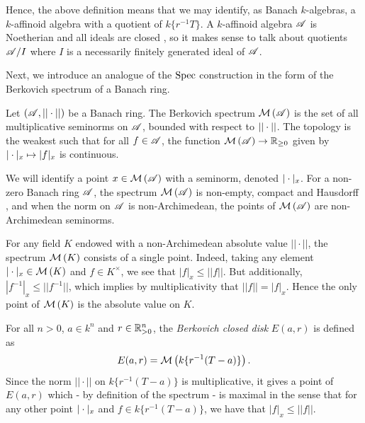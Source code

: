 Hence, the above definition means that we may identify, as Banach $k$-algebras, a $k$-affinoid algebra with a quotient of $k\{r^{-1}T\}$. 
A $k$-affinoid algebra $\mathscr{A}$ is Noetherian and all ideals are closed \parencite[Prop. 2.1.3]{berk1}, so it makes sense to talk about quotients $\mathscr{A}/I$ where $I$ is a necessarily finitely generated ideal of $\mathscr{A}$.

Next, we introduce an analogue of the $\operatorname{Spec}$ construction in the form of the Berkovich spectrum of a Banach ring.

\begin{defn}\parencite[\S 1.2]{berk1}
    Let $(\mathscr{A}, ||\cdot||)$ be a Banach ring. The Berkovich spectrum $\mathcal{M}\left(\mathscr{A}\right)$ is the set of
    all multiplicative seminorms on $\mathscr{A}$, bounded with respect to $||\cdot||$. The topology is the
    weakest such that for all $f \in \mathscr{A}$, the function $\mathcal{M}\left(\mathscr{A}\right) \to \mathbb{R}_{\geq 0}$ given by $|\cdot|_x \mapsto |f|_x$ is continuous.
\end{defn}

We will identify a point $x \in \mathcal{M}\left(\mathscr{A}\right)$ with a seminorm, denoted $|\cdot|_x$. 
For a non-zero Banach ring $\mathscr{A}$, the spectrum $\mathcal{M}\left(\mathscr{A}\right)$ is non-empty, compact and Hausdorff \parencite[Theorem 1.2.1]{berk1}, and when the norm on $\mathscr{A}$ is non-Archimedean, the points of $\mathcal{M}\left(\mathscr{A}\right)$ are non-Archimedean seminorms.

\begin{example}
    For any field $K$ endowed with a non-Archimedean absolute value $||\cdot||$, the spectrum $\mathcal{M}\left(K\right)$ consists of a single point.
    Indeed, taking any element ${|\cdot|_x} \in \mathcal{M}\left(K\right)$ and $f \in K^{\times}$, we see that $|f|_x \leq ||f||$. But additionally, $|f^{-1}|_x \leq ||f^{-1}||$, which implies by multiplicativity that $||f|| = |f|_x$. 
    Hence the only point of $\mathcal{M}\left(K\right)$ is the absolute value on $K$.
\end{example}

\begin{example}
     For all $n > 0$, $ {a} \in k^n$ and $ {r} \in \mathbb{R}_{> 0}^n$, the \textit{Berkovich closed disk} $E( {a},  {r})$ is defined as 
     \[E( {a},  {r)} = \mathcal{M}\left(k\{ {r}^{-1}( {T} -  {a})\}\right).\] 
     Since the norm $||\cdot||$ on $k\{ {r}^{-1}( {T} -  {a})\}$ is multiplicative, it gives a point of $E( {a},  {r})$ which - by definition of the spectrum - is maximal in the sense that for any other point $|\cdot|_x$ and $f \in k\{ {r}^{-1}( {T} -  {a})\}$, we have that $|f|_x \leq ||f||$.
\end{example}

